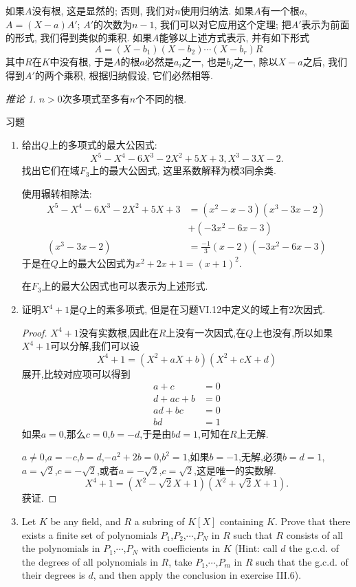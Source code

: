\documentclass[12pt,a4paper]{book} %
\theoremstyle{remark}
\theoremstyle{example}
\theoremstyle{lemma}
\theoremstyle{corollary}
\newtheorem{corollary}[theorem]{推论}
\numberwithin{theorem}{chapter}
\begin{document}
如果$A$没有根, 这是显然的; 否则, 我们对$n$使用归纳法. 如果$A$有一个根$a$, $A = (X - a) A'$; $A'$的次数为$n - 1$, 我们可以对它应用这个定理; 把$A'$表示为前面的形式, 我们得到类似的乘积. 如果$A$能够以上述方式表示, 并有如下形式
\[
A = (X - b_1)(X - b_2) \cdots (X - b_r)R
\]
其中$R$在$K$中没有根, 于是$A$的根$a$必然是$a_i$之一, 也是$b_j$之一, 除以$X - a$之后, 我们得到$A'$的两个乘积, 根据归纳假设, 它们必然相等.

\begin{corollary}
$n > 0$次多项式至多有$n$个不同的根.
\end{corollary}

习题

\begin{enumerate}
\item 给出$Q$上的多项式的最大公因式:
\[
X^5 - X^4 - 6X^3 - 2X^2 + 5X + 3, X^3 - 3X - 2.
\]
找出它们在域$F_3$上的最大公因式, 这里系数解释为模3同余类.

使用辗转相除法:
\[
\begin{aligned}
X^5 - X^4 - 6X^3 - 2X^2 + 5X + 3 &= (x^2-x-3)(x^3-3x-2)\\
&+(-3x^2-6x-3) \\
(x^3-3x-2)&=\frac{-1}{3}(x-2)(-3x^2-6x-3)
\end{aligned}
\]
于是在$Q$上的最大公因式为$x^2+2x+1=(x+1)^2$.

在$F_3$上的最大公因式也可以表示为上述形式.
\item 证明$X^4 + 1$是$Q$上的素多项式, 但是在习题VI.12中定义的域上有2次因式.

\begin{proof}
$X^4+1$没有实数根,因此在$R$上没有一次因式,在$Q$上也没有,所以如果$X^4+1$可以分解,我们可以设
\[
X^4+1=(X^2+aX+b)(X^2+cX+d)
\]
展开,比较对应项可以得到
\[
\begin{aligned}
a + c &= 0\\
d + ac + b &= 0 \\
ad + bc &= 0\\
bd &= 1
\end{aligned}
\]
如果$a=0$,那么$c=0$,$b=-d$,于是由$bd=1$,可知在$R$上无解.

$a \neq 0$,$a=-c$,$b=d$,$-a^2+2b=0$,$b^2=1$,如果$b=-1$,无解,必须$b=d=1$,$a=\sqrt{2}$,$c=-\sqrt{2}$,或者$a=-\sqrt{2}$,$c=\sqrt{2}$,这是唯一的实数解.
\[
X^4+1=(X^2-\sqrt{2}X+1)(X^2+\sqrt{2}X+1).
\]
获证.
\end{proof}

\item Let $K$ be any field, and $R$ a subring of $K[X]$ containing $K$. Prove that there exists a finite set of polynomials $P_1$,$P_2$,$\cdots$,$P_N$ in $R$ such that $R$ consists of all the polynomials in $P_1$,$\cdots$,$P_N$ with coefficients in $K$ (Hint: call $d$ the g.c.d. of the degrees of all polynomials in $R$, take $P_1$,$\cdots$,$P_m$ in $R$ such that the g.c.d. of their degrees is $d$, and then apply the conclusion in exercise III.6).


\end{enumerate}
\end{document}
